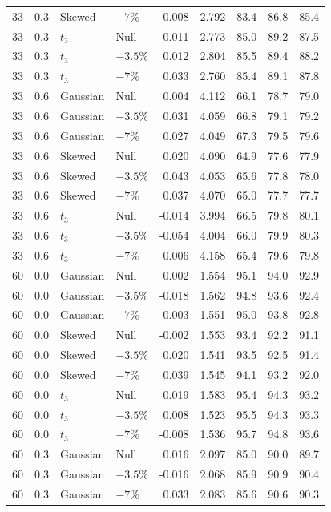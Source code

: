 \begin{longtable}{rrllrrrrr}
33 & 0.3 & Skewed & $-7\%$ & -0.008 & 2.792 & 83.4 & 86.8 & 85.4 \\
33 & 0.3 & $t_3$ & Null & -0.011 & 2.773 & 85.0 & 89.2 & 87.5 \\
33 & 0.3 & $t_3$ & $-3.5\%$ & 0.012 & 2.804 & 85.5 & 89.4 & 88.2 \\
33 & 0.3 & $t_3$ & $-7\%$ & 0.033 & 2.760 & 85.4 & 89.1 & 87.8 \\
33 & 0.6 & Gaussian & Null & 0.004 & 4.112 & 66.1 & 78.7 & 79.0 \\
33 & 0.6 & Gaussian & $-3.5\%$ & 0.031 & 4.059 & 66.8 & 79.1 & 79.2 \\
33 & 0.6 & Gaussian & $-7\%$ & 0.027 & 4.049 & 67.3 & 79.5 & 79.6 \\
33 & 0.6 & Skewed & Null & 0.020 & 4.090 & 64.9 & 77.6 & 77.9 \\
33 & 0.6 & Skewed & $-3.5\%$ & 0.043 & 4.053 & 65.6 & 77.8 & 78.0 \\
33 & 0.6 & Skewed & $-7\%$ & 0.037 & 4.070 & 65.0 & 77.7 & 77.7 \\
33 & 0.6 & $t_3$ & Null & -0.014 & 3.994 & 66.5 & 79.8 & 80.1 \\
33 & 0.6 & $t_3$ & $-3.5\%$ & -0.054 & 4.004 & 66.0 & 79.9 & 80.3 \\
33 & 0.6 & $t_3$ & $-7\%$ & 0.006 & 4.158 & 65.4 & 79.6 & 79.8 \\
60 & 0.0 & Gaussian & Null & 0.002 & 1.554 & 95.1 & 94.0 & 92.9 \\
60 & 0.0 & Gaussian & $-3.5\%$ & -0.018 & 1.562 & 94.8 & 93.6 & 92.4 \\
60 & 0.0 & Gaussian & $-7\%$ & -0.003 & 1.551 & 95.0 & 93.8 & 92.8 \\
60 & 0.0 & Skewed & Null & -0.002 & 1.553 & 93.4 & 92.2 & 91.1 \\
60 & 0.0 & Skewed & $-3.5\%$ & 0.020 & 1.541 & 93.5 & 92.5 & 91.4 \\
60 & 0.0 & Skewed & $-7\%$ & 0.039 & 1.545 & 94.1 & 93.2 & 92.0 \\
60 & 0.0 & $t_3$ & Null & 0.019 & 1.583 & 95.4 & 94.3 & 93.2 \\
60 & 0.0 & $t_3$ & $-3.5\%$ & 0.008 & 1.523 & 95.5 & 94.3 & 93.3 \\
60 & 0.0 & $t_3$ & $-7\%$ & -0.008 & 1.536 & 95.7 & 94.8 & 93.6 \\
60 & 0.3 & Gaussian & Null & 0.016 & 2.097 & 85.0 & 90.0 & 89.7 \\
60 & 0.3 & Gaussian & $-3.5\%$ & -0.016 & 2.068 & 85.9 & 90.9 & 90.4 \\
60 & 0.3 & Gaussian & $-7\%$ & 0.033 & 2.083 & 85.6 & 90.6 & 90.3 \\

\end{longtable}
